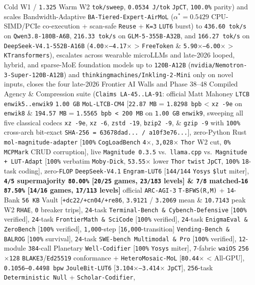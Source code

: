 \documentclass[10pt]{article}
\begin{document}
{Cold W1 / \texttt{1.325} Warm W2 \texttt{tok/sweep}, \texttt{0.0534 J/tok} \texttt{JpCT}, \texttt{100.0\%} parity) and scales Bandwidth-Adaptive \texttt{BA-Tiered-Expert-AirMoL} ($\alpha^* = 0.5429$ CPU-SIMD/PCIe co-execution + scan-safe \texttt{Reuse} + \texttt{K=3} \texttt{LUT6} burst) to \texttt{436.60 tok/s} on \texttt{Qwen3.8-180B-A6B}, \texttt{216.33 tok/s} on \texttt{GLM-5-355B-A32B}, and \texttt{166.27 tok/s} on \texttt{DeepSeek-V4.1-552B-A16B} (\texttt{4.00$\times$--4.17$\times$} > \texttt{FreeToken} \& \texttt{5.90$\times$--6.00$\times$} > \texttt{KTransformers}), escalates across wearable microLLMs and late-2026 looped, hybrid, and sparse-MoE foundation models up to \texttt{120B-A12B} (\texttt{nvidia/Nemotron-3-Super-120B-A12B}) and \texttt{thinkingmachines/Inkling-2-Mini} only on novel inputs, closes the four late-2026 Frontier AI Walls and Phase 38--48 Compiled Agency \& Compression suite (\texttt{Claims LA-45..LA-91}: official Matt Mahoney \texttt{LTCB} \texttt{enwik5..enwik9} \texttt{1.00 GB} \texttt{MoL-LTCB-CM4} [\texttt{22.87 MB} = \texttt{1.8298 bpb} < \texttt{xz -9e} on \texttt{enwik8} \& \texttt{194.57 MB} = \texttt{1.5565 bpb < 200 MB} on \texttt{1.00 GB} \texttt{enwik9}, sweeping all five classical codecs \texttt{xz -9e}, \texttt{xz -6}, \texttt{zstd -19}, \texttt{bzip2 -9}, \& \texttt{gzip -9} with \texttt{100\%} cross-arch bit-exact \texttt{SHA-256 = 63678dad... / a10f3e76...}], zero-Python Rust \texttt{mol-magnitude-adapter} [\texttt{100\%} \texttt{CogLoadBench} \texttt{4$\times$}, \texttt{3,028$\times$} \texttt{Thor} W2 cut, \texttt{0\%} \texttt{MCPMark} CRUD corruption], live \texttt{Magnitude 0.3.5} vs.\ \texttt{llama.cpp} vs.\ \texttt{Magnitude + LUT-Adapt} [\texttt{100\%} verbatim \texttt{Moby-Dick}, \texttt{53.55$\times$} lower \texttt{Thor} \texttt{twist} \texttt{JpCT}, \texttt{100\%} \texttt{18}-task coding], zero-\texttt{FLOP} \texttt{DeepSeek-V4.1} \texttt{Engram-LUT6} [\texttt{144/144} \texttt{Yosys} \texttt{\$lut} miter], \textbf{\texttt{4/5} supermajority \texttt{80.00\%} [\texttt{20/25} games, \texttt{23/183} levels] \& \texttt{7/8} matched-\texttt{16} \texttt{87.50\%} [\texttt{14/16} games, \texttt{17/113} levels]} official \texttt{ARC-AGI-3} \texttt{T-BFWS(R,M)} + \texttt{14}-Bank \texttt{56 KB} Vault [\texttt{+dc22/+cn04/+re86}, \texttt{3.9121} / \texttt{3.2069} mean \& \texttt{10.7143} peak W2 \texttt{RHAE}, \texttt{0} breaker trips], \texttt{24}-task \texttt{Terminal-Bench \& Cybench-Defensive} [\texttt{100\%} verified], \texttt{24}-task \texttt{FrontierMath \& SciCode} [\texttt{100\%} verified], \texttt{24}-task \texttt{EnigmaEval \& ZeroBench} [\texttt{100\%} verified], \texttt{1,000}-step [\texttt{16,000}-transition] \texttt{Vending-Bench \& BALROG} [\texttt{100\%} survival], \texttt{24}-task \texttt{SWE-bench Multimodal \& Pro} [\texttt{100\%} verified], \texttt{12}-module \texttt{384}-call Planetary \texttt{Well-Codifier} [\texttt{100\%} \texttt{Yosys} miter], \texttt{7}-fabric \texttt{waiOS} \texttt{256$\times$128} \texttt{BLAKE3}/\texttt{Ed25519} conformance + \texttt{HeteroMosaic-MoL} [\texttt{80.44$\times$} < All-GPU], \texttt{0.1056--0.4498 bpw} \texttt{JouleBit-LUT6} [\texttt{3.104$\times$--3.414$\times$} \texttt{JpCT}], \texttt{256}-task \texttt{Deterministic Null} + \texttt{Scholar-Codifier}, }
\end{document}
